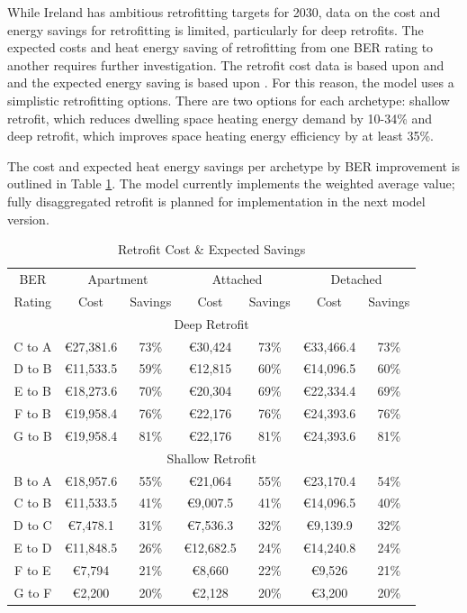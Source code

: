 \documentclass[journal abbreviation, manuscript]{copernicus}
\begin{document}
While Ireland has ambitious retrofitting targets for 2030, data on the cost and energy savings for retrofitting is limited, particularly for deep retrofits. The expected costs and heat energy saving of retrofitting from one BER rating to another requires further investigation. The retrofit cost data is based upon \citep{AECOMDECLG2013} and \citep{Ali2020} and the expected energy saving is based upon \citep{Collins2017}. For this reason, the model uses a simplistic retrofitting options. There are two options for each archetype: shallow retrofit, which reduces dwelling space heating energy demand by 10-34\% and deep retrofit, which improves space heating energy efficiency by at least 35\%. 

The cost and expected heat energy savings per archetype by BER improvement is outlined in Table \ref{Retrofit Expected Savings}. The model currently implements the weighted average value; fully disaggregated retrofit is planned for implementation in the next model version.

\begin{table}[h!]
 \centering
 \footnotesize
 \caption{Retrofit Cost \& Expected Savings}
 \begin{tabular}{ccccccc}
 \hline
 BER & \multicolumn{2}{c}{Apartment} & \multicolumn{2}{c}{Attached} & \multicolumn{2}{c}{Detached} \\ 
 Rating & Cost & Savings & Cost & Savings & Cost & Savings \\
 \hline
 \multicolumn{7}{c}{Deep Retrofit} \\
 \hline
 C to A & €27,381.6 & 73\% & €30,424 & 73\% & €33,466.4 & 73\% \\
 D to B	& €11,533.5 & 59\% & €12,815 & 60\% & €14,096.5 & 60\% \\
 E to B & €18,273.6 & 70\% & €20,304 & 69\% & €22,334.4 & 69\% \\
 F to B & €19,958.4 & 76\% & €22,176 & 76\% & €24,393.6 & 76\% \\
 G to B & €19,958.4 & 81\% & €22,176 & 81\% & €24,393.6 & 81\% \\
 \hline
 \multicolumn{7}{c}{Shallow Retrofit} \\[0.5ex]
 \hline
 B to A & €18,957.6 & 55\% & €21,064 & 55\% & €23,170.4 & 54\% \\
 C to B & €11,533.5 & 41\% & €9,007.5 & 41\% & €14,096.5 & 40\% \\
 D to C & €7,478.1 & 31\% & €7,536.3 & 32\% & €9,139.9 & 32\% \\
 E to D & €11,848.5 & 26\% & €12,682.5 & 24\% & €14,240.8 & 24\% \\
 F to E & €7,794 & 21\% & €8,660 & 22\% & €9,526 & 21\% \\
 G to F & €2,200 & 20\% & €2,128 & 20\% & €3,200 & 20\% \\ \hline
 \end{tabular}
 
 \label{Retrofit Expected Savings}
\end{table}
\end{document}
